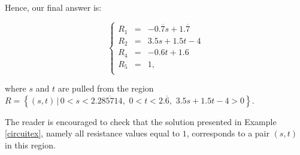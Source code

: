 \documentclass{ximera}
\begin{document}
\begin{example}
\begin{explanation}
 Hence,  our final answer is:    
 
 
 \[ \left\{ \begin{array}{rcr}
R_1 & = & - 0.\overline{7}s + 1.\overline{7}\\
R_2  & = &  3.5s + 1.5t - 4 \\
R_4  & = &  -0.6t + 1.6 \\
R_5 & = & 1, \\  \end{array} \right.\]
 
where $s$ and $t$ are pulled from the region $R = \left\{ (s,t) \, | \,  0 < s < 2.\overline{285714}, \, \,  0 < t < 2.\overline{6}, \, \, 3.5s+1.5t-4 > 0\right\}$.  

The reader is encouraged to check that the solution presented in Example \ref{circuitex}, namely all resistance values equal to $1$, corresponds to a pair $(s,t)$ in this region. 
\end{explanation}
\end{example}



\closegraphsfile
\end{document}
